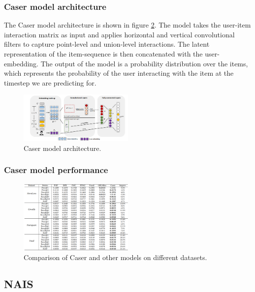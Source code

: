 \documentclass{ieeetj}
\begin{document}
\subsubsection{Caser model architecture}
\label{sec: caser-architecture}

The Caser model architecture is shown in figure \ref{fig:caser-architecture}. The model takes the user-item interaction matrix as input and applies horizontal and vertical convolutional filters to capture point-level and union-level interactions. The latent representation of the item-sequence is then concatenated with the user-embedding. The output of the model is a probability distribution over the items, which represents the probability of the user interacting with the item at the timestep we are predicting for.
\begin{figure}[h]
\centering
\includegraphics[width=0.5\textwidth]{figures/caser-architecture.png}
\caption{Caser model architecture.}
\label{fig:caser-architecture}
\end{figure}

\subsubsection{Caser model performance}
\begin{figure}[h]
	\centering
	\includegraphics[width=0.5\textwidth]{figures/caser-performance.png}
	\caption{Comparison of Caser and other models on different datasets.}
	\label{fig:caser-architecture}
\end{figure}
\FloatBarrier
\subsection{NAIS}
\end{document}
